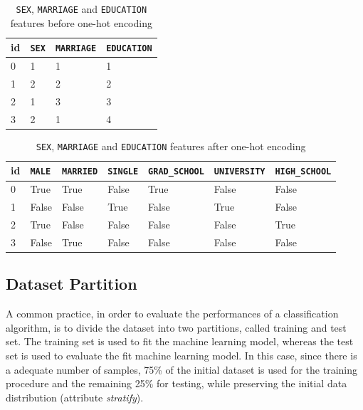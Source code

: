 \documentclass{article}
\begin{document}
\begin{table}[H]
\centering
\begin{tabular}{llll}
\textbf{id} & \textbf{\texttt{SEX}} & \textbf{\texttt{MARRIAGE}} & \textbf{\texttt{EDUCATION}} \\ \hline
0           & 1            & 1                 & 1                  \\
1           & 2            & 2                 & 2                  \\
2           & 1            & 3                 & 3                  \\
3           & 2            & 1                 & 4                 
\end{tabular}
\caption{\texttt{SEX}, \texttt{MARRIAGE} and \texttt{EDUCATION} features before one-hot encoding}
\end{table}

\begin{table}[H]
\centering
\begin{tabular}{lllllll}
\textbf{id} & \textbf{\texttt{MALE}} & \textbf{\texttt{MARRIED}} & \textbf{\texttt{SINGLE}} & \textbf{\texttt{GRAD\_SCHOOL}} & \textbf{\texttt{UNIVERSITY}} & \textbf{\texttt{HIGH\_SCHOOL}} \\ \hline
0           & True          & True             & False           & True                  & False               & False                 \\
1           & False         & False            & True            & False                 & True                & False                 \\
2           & True          & False            & False           & False                 & False               & True                  \\
3           & False         & True             & False           & False                 & False               & False                
\end{tabular}
\caption{\texttt{SEX}, \texttt{MARRIAGE} and \texttt{EDUCATION} features after one-hot encoding}
\end{table}

\subsection{Dataset Partition}

A common practice, in order to evaluate the performances of a classification algorithm, is to divide the dataset into two partitions, called training and test set. The training set is used to fit the machine learning model, whereas the test set is used to evaluate the fit machine learning model. In this case, since there is
a adequate number of samples, 75\% of the initial dataset is used for the training procedure and the remaining 25\% for testing, while preserving the initial data distribution (attribute \emph{stratify}).
\end{document}

